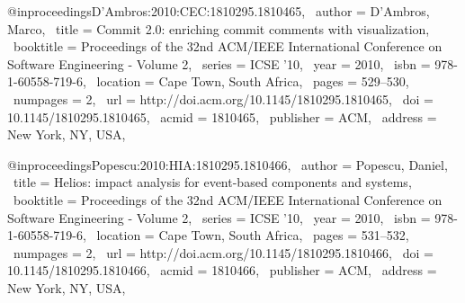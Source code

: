 @inproceedings{D'Ambros:2010:CEC:1810295.1810465,
 author = {D'Ambros, Marco},
 title = {Commit 2.0: enriching commit comments with visualization},
 booktitle = {Proceedings of the 32nd ACM/IEEE International Conference on Software Engineering - Volume 2},
 series = {ICSE '10},
 year = {2010},
 isbn = {978-1-60558-719-6},
 location = {Cape Town, South Africa},
 pages = {529--530},
 numpages = {2},
 url = {http://doi.acm.org/10.1145/1810295.1810465},
 doi = {10.1145/1810295.1810465},
 acmid = {1810465},
 publisher = {ACM},
 address = {New York, NY, USA},
} 

@inproceedings{Popescu:2010:HIA:1810295.1810466,
 author = {Popescu, Daniel},
 title = {Helios: impact analysis for event-based components and systems},
 booktitle = {Proceedings of the 32nd ACM/IEEE International Conference on Software Engineering - Volume 2},
 series = {ICSE '10},
 year = {2010},
 isbn = {978-1-60558-719-6},
 location = {Cape Town, South Africa},
 pages = {531--532},
 numpages = {2},
 url = {http://doi.acm.org/10.1145/1810295.1810466},
 doi = {10.1145/1810295.1810466},
 acmid = {1810466},
 publisher = {ACM},
 address = {New York, NY, USA},
} 

